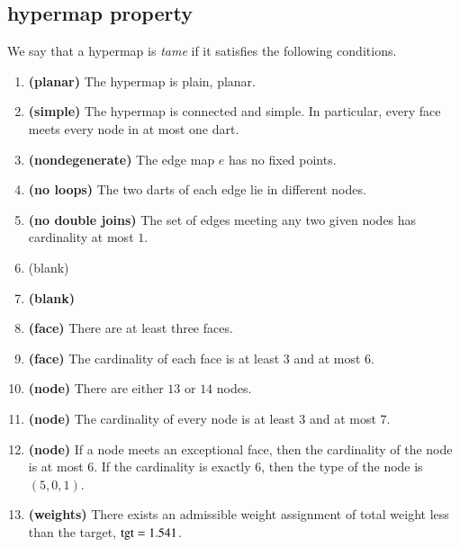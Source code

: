 \subsection{hypermap property}
\label{sec:graphproperty}



We say that a hypermap is {\it tame\/} if it satisfies the following
conditions.
%

\begin{enumerate}
    \label{definition:tame}
    \item {\bf (planar)} The hypermap is plain, planar.
    \item {\bf (simple)} The hypermap is connected and simple.  In particular, every face meets every node in at most one dart.
    \item {\bf (nondegenerate)} The edge map $e$ has no fixed points.
    \item {\bf (no loops)} The two darts of each edge lie in different nodes.
    \item {\bf (no double joins)} The set of edges meeting any two given nodes has cardinality at most $1$.
    \label{definition:tame:40}
    \item {(blank)}
\item {\bf (blank)}
  \item {\bf (face)} There are at least three faces.
    \item {\bf (face)} The cardinality of each face is at least $3$ and at most $6$.
    \label{definition:tame:length}
    \item {\bf (node)} There are either $13$ or $14$ nodes.
    \item {\bf (node)} The cardinality of every node is at least $3$ and at most
    $7$.
    \label{definition:tame:degree}
    \item {\bf (node)} If a node meets an exceptional face,
        then the cardinality of the node is at most $6$.  If the
        cardinality is exactly $6$, then the type of the node
        is $(5,0,1)$.
    \label{definition:tame:degreeE}
    \item {\bf (weights)} There exists an admissible weight assignment
        of total weight less than the target, ${\operatorname{tgt}}=1.541$.
    \label{definition:tame:squander}
\end{enumerate}
%

